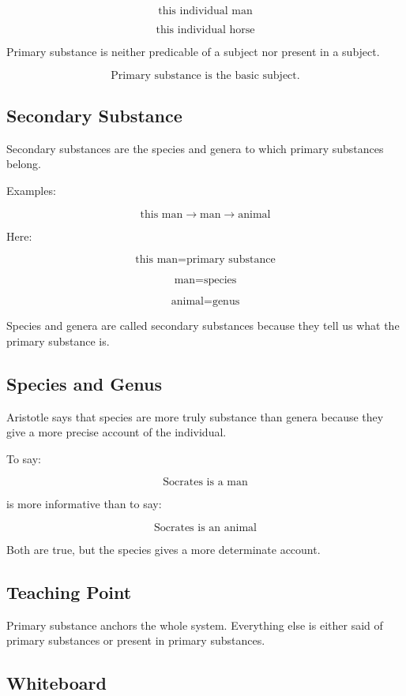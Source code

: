\documentclass[12pt]{article}
\begin{document}
\[
\text{this individual man}
\]

\[
\text{this individual horse}
\]

Primary substance is neither predicable of a subject nor present in a subject.

\[
\boxed{
\text{Primary substance is the basic subject.}
}
\]

\subsection*{Secondary Substance}

Secondary substances are the species and genera to which primary substances
belong.

Examples:

\[
\text{this man} \rightarrow \text{man} \rightarrow \text{animal}
\]

Here:

\[
\text{this man} = \text{primary substance}
\]

\[
\text{man} = \text{species}
\]

\[
\text{animal} = \text{genus}
\]

Species and genera are called secondary substances because they tell us what
the primary substance is.

\subsection*{Species and Genus}

Aristotle says that species are more truly substance than genera because they
give a more precise account of the individual.

To say:

\[
\text{Socrates is a man}
\]

is more informative than to say:

\[
\text{Socrates is an animal}
\]

Both are true, but the species gives a more determinate account.

\subsection*{Teaching Point}

Primary substance anchors the whole system. Everything else is either said of
primary substances or present in primary substances.

\subsection*{Whiteboard}
\end{document}
